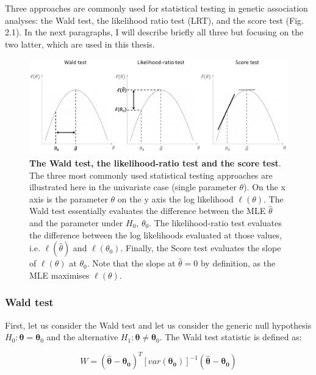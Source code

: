 
\vspace{5mm}

Three approaches are commonly used for statistical testing in genetic association analyses: the Wald test, the likelihood ratio test (LRT), and the score test (Fig. 2.1).
In the next paragraphs, I will describe briefly all three but focusing on the two latter, which are used in this thesis.

\begin{figure}[h]
\centering
\includegraphics[width=15cm]{Chapter2/Fig/wald_lrt_score_tests.png}
\caption{\textbf{The Wald test, the likelihood-ratio test and the score test}.\\
The three most commonly used statistical testing approaches are illustrated here in the univariate case (single parameter $\theta$). 
On the x axis is the parameter $\theta$ on the y axis the log likelihood $\ell(\theta)$.
The Wald test essentially evaluates the difference between the MLE $\hat{\theta}$ and the parameter under $H_0$, $\theta_0$.
The likelihood-ratio test evaluates the difference between the log likelihoods evaluated at those values, i.e. $\ell(\hat{\theta})$ and $\ell(\theta_0)$.
Finally, the Score test evaluates the slope of $\ell(\theta)$ at $\theta_0$. Note that the slope at $\hat{\theta}=0$ by definition, as the MLE maximises $\ell(\theta)$.}
\end{figure}

\subsubsection{Wald test}

First, let us consider the Wald test and let us consider the generic null hypothesis $H_0: \boldsymbol{\theta} = \boldsymbol{\theta}_0$ and the alternative $H_1: \boldsymbol{\theta} \neq \boldsymbol{\theta}_0$.
The Wald test statistic is defined as:

\begin{equation}
W = (\hat{\boldsymbol{\theta}}-\boldsymbol{\theta_0})^T [var(\boldsymbol{\theta_0})]^{-1}(\hat{\boldsymbol{\theta}}-\boldsymbol{\theta_0}) 
\end{equation}

